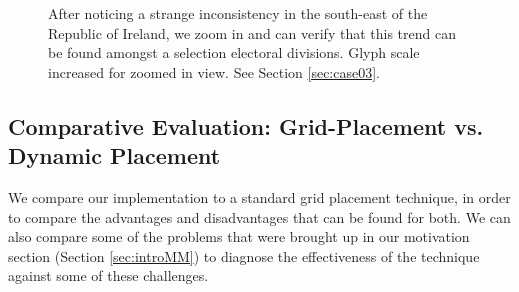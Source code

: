 \begin{figure}[t]
\caption{After noticing a strange inconsistency in the south-east of the Republic of Ireland, we zoom in and can verify that this trend can be found amongst a selection electoral divisions. Glyph scale increased for zoomed in view. See Section \ref{sec:case03}.} \label{fig:case03}
\end{figure}


\subsection{Comparative Evaluation: Grid-Placement vs. Dynamic Placement} \label{sec:grid}
We compare our implementation to a standard grid placement technique, in order to compare the advantages and disadvantages that can be found for both. We can also compare some of the problems that were brought up in our motivation section (Section \ref{sec:introMM}) to diagnose the effectiveness of the technique against some of these challenges.

